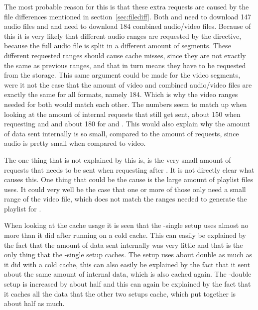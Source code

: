 \documentclass[twoside,openright]{uva-bachelor-thesis}
\begin{document}
The most probable reason for this is that these extra requests
are caused by the file differences mentioned in section~\ref{sec:filediff}.
Both \dash and \iss need to download 147 audio files and \hds and \hls need to
download 184 combined audio/video files. Because of this it is very likely that
different audio ranges are requested by the \ipplong directive, because the full
audio file is split in a different amount of segments. These different requested
ranges should cause cache misses, since they are not exactly the same as
previous ranges, and that in turn means they have to be requested from the
storage. This same argument could be made for the video segments, were it not
the case that the amount of video and combined audio/video files are exactly the
same for all formats, namely 184.  Which is why the video ranges needed for
both would match each other. The numbers seem to match up when looking at the
amount of internal requests that still get sent, about 150 when requesting \dash
and \iss and about 180 for \hds and \hls.  This would also explain why the
amount of data sent internally is so small, compared to the amount of requests,
since audio is pretty small when compared to video.

The one thing that is not explained by this is, is the very small amount of
requests that needs to be sent when requesting \hls after \hds. It is not
directly clear what causes this. One thing that could be the cause is the large
amount of playlist files \hls uses. It could very well be the case that one or
more of those only need a small range of the video file, which does not match
the ranges needed to generate the playlist for \hds.

When looking at the cache usage it is seen that the \lt-single setup uses almost
no more than it did after running on a cold cache. This can easily be explained
by the fact that the amount of data sent internally was very little and that is
the only thing that the \lt-single setup caches. The \cdn setup uses about
double as much as it did with a cold cache, this can also easily be explained by
the fact that it sent about the same amount of internal data, which is also
cached again. The \lt-double setup is increased by about half and this can again
be explained by the fact that it caches all the data that the other two setups
cache, which put together is about half as much.
\end{document}
